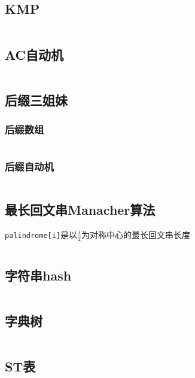 \documentclass[a4paper]{article}
\newcommand{\cppcode}[1]{
    \inputminted[mathescape]{cpp}{#1}
}
\begin{document}
\subsection{KMP}

\cppcode{string/kmp.cpp}

\subsection{AC自动机}

\cppcode{string/ACautomaton(lrj).cpp}

\subsection{后缀三姐妹}

\subsubsection{后缀数组}

\cppcode{string/SuffixArray.cpp}

\subsubsection{后缀自动机}

\cppcode{string/suffix-automaton.cpp}

\subsection{最长回文串Manacher算法}

\texttt{palindrome[i]}是以$\frac{i}{2}$为对称中心的最长回文串长度

\cppcode{string/manacher.cpp}

\subsection{字符串hash}

\cppcode{string/hash.cpp}

\subsection{字典树}

\cppcode{string/Trie(lsrs).cpp}


\subsection{ST表}
\end{document}
